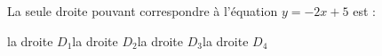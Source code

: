 
La seule droite pouvant correspondre à l'équation $y=-2x+5$ est :

\smallskip

\qcmgraph%
	{la droite $D_{1}$}{la droite $D_{2}$}{la droite $D_{3}$}{la droite $D_{4}$}%
	{}%
	{}%
	{}%
	{}%